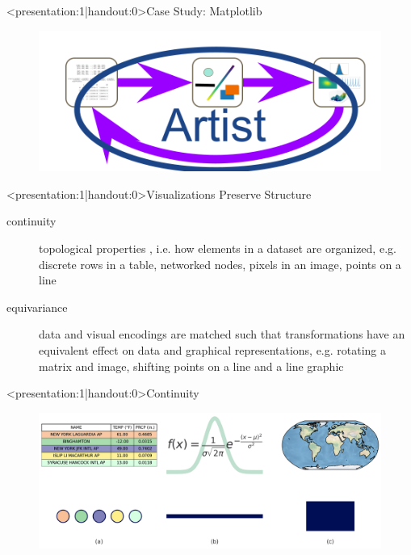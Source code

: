 \documentclass[xcolor={dvipsnames}]{beamer}
\begin{document}
\begin{frame}<presentation:1|handout:0>{Case Study: Matplotlib}
    \begin{figure}
       \includegraphics[width=\linewidth]{figures/flow/artists.png}
    \end{figure}
\end{frame}

\begin{frame}<presentation:1|handout:0>{Visualizations Preserve Structure}
    \begin{description}
        \item [continuity] topological properties \cite{wilkinsonGrammarGraphics2005}, i.e. how elements in a dataset are organized, e.g. discrete rows in a table, networked nodes, pixels in an image, points on a line
        \item [equivariance] data and visual encodings are matched such that transformations have an equivalent effect on data and graphical representations, e.g. rotating a matrix and image, shifting  points on a line and a line graphic
      \end{description}
\end{frame}

\begin{frame}<presentation:1|handout:0>{Continuity}
    \begin{figure}
        \includegraphics[width=\linewidth]{../paper/figures/k_different_types.png}
    \end{figure}
\end{frame}
\end{document}
